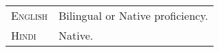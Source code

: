 %
%



\begin{tabular}{ll}
	\textsc{English	} & Bilingual or Native proficiency.\\
	\textsc{Hindi		} & Native.
\end{tabular}
